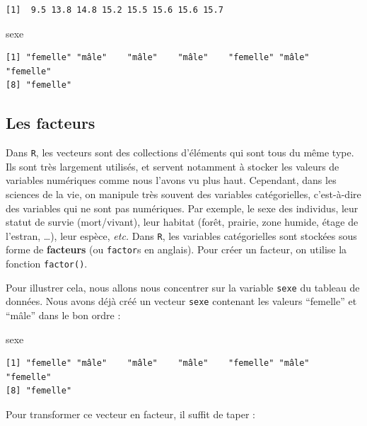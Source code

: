 \documentclass[
  a4paper,
  DIV=11,
  numbers=noendperiod,
  oneside]{scrreprt}
\newenvironment{Shaded}{}{}
\newcommand{\NormalTok}[1]{\textcolor[rgb]{0.14,0.16,0.18}{#1}}
\begin{document}
\begin{verbatim}
[1]  9.5 13.8 14.8 15.2 15.5 15.6 15.6 15.7
\end{verbatim}

\begin{Shaded}
\begin{Highlighting}[]
\NormalTok{sexe}
\end{Highlighting}
\end{Shaded}

\begin{verbatim}
[1] "femelle" "mâle"    "mâle"    "mâle"    "femelle" "mâle"    "femelle"
[8] "femelle"
\end{verbatim}

\subsection{Les facteurs}\label{sec-factors}

Dans \texttt{R}, les vecteurs sont des collections d'éléments qui sont
tous du même type. Ils sont très largement utilisés, et servent
notamment à stocker les valeurs de variables numériques comme nous
l'avons vu plus haut. Cependant, dans les sciences de la vie, on
manipule très souvent des variables catégorielles, c'est-à-dire des
variables qui ne sont pas numériques. Par exemple, le sexe des
individus, leur statut de survie (mort/vivant), leur habitat (forêt,
prairie, zone humide, étage de l'estran, \ldots), leur espèce,
\emph{etc.} Dans \texttt{R}, les variables catégorielles sont stockées
sous forme de \textbf{facteurs} (ou \texttt{factor}s en anglais). Pour
créer un facteur, on utilise la fonction \texttt{factor()}.

Pour illustrer cela, nous allons nous concentrer sur la variable
\texttt{sexe} du tableau de données. Nous avons déjà créé un vecteur
\texttt{sexe} contenant les valeurs ``femelle'' et ``mâle'' dans le bon
ordre :

\begin{Shaded}
\begin{Highlighting}[]
\NormalTok{sexe}
\end{Highlighting}
\end{Shaded}

\begin{verbatim}
[1] "femelle" "mâle"    "mâle"    "mâle"    "femelle" "mâle"    "femelle"
[8] "femelle"
\end{verbatim}

Pour transformer ce vecteur en facteur, il suffit de taper :
\end{document}
